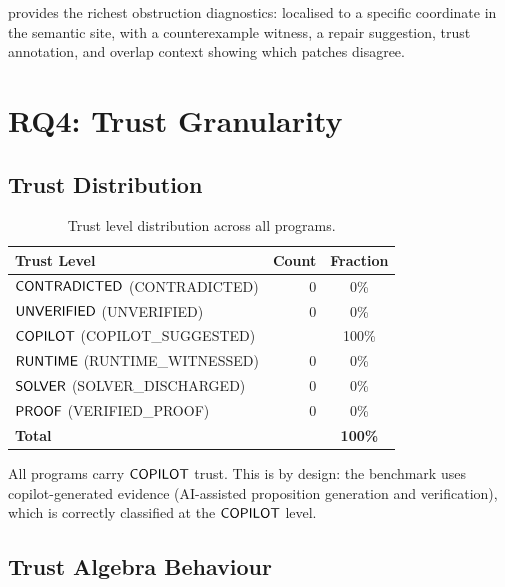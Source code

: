\documentclass[11pt]{article}
\begin{document}
\JuGeo{} provides the richest obstruction diagnostics: localised to
a specific coordinate in the semantic site, with a counterexample
witness, a repair suggestion, trust annotation, and overlap context
showing which patches disagree.

\section{RQ4: Trust Granularity}\label{sec:rq4}

\subsection{Trust Distribution}

\begin{table}[H]
\centering
\caption{Trust level distribution across all programs.}\label{tab:trust}
\begin{tabular}{@{}l r c@{}}
\toprule
\textbf{Trust Level} & \textbf{Count} & \textbf{Fraction} \\
\midrule
$\mathsf{CONTRADICTED}$ (\textsf{CONTRADICTED})       & 0  & 0\% \\
$\mathsf{UNVERIFIED}$ (\textsf{UNVERIFIED})           & 0  & 0\% \\
$\mathsf{COPILOT}$ (\textsf{COPILOT\_SUGGESTED})  & \expTrustCOPILOTSUGGESTED{} & 100\% \\
$\mathsf{RUNTIME}$ (\textsf{RUNTIME\_WITNESSED}) & 0  & 0\% \\
$\mathsf{SOLVER}$ (\textsf{SOLVER\_DISCHARGED})  & 0  & 0\% \\
$\mathsf{PROOF}$ (\textsf{VERIFIED\_PROOF})      & 0  & 0\% \\
\midrule
\textbf{Total} & \textbf{\expTotalPrograms{}} & \textbf{100\%} \\
\bottomrule
\end{tabular}
\end{table}

All \expTrustCOPILOTSUGGESTED{} programs carry $\mathsf{COPILOT}$ trust.
This is by design: the benchmark uses copilot-generated evidence
(AI-assisted proposition generation and verification), which is
correctly classified at the $\mathsf{COPILOT}$ level.

\subsection{Trust Algebra Behaviour}
\end{document}
